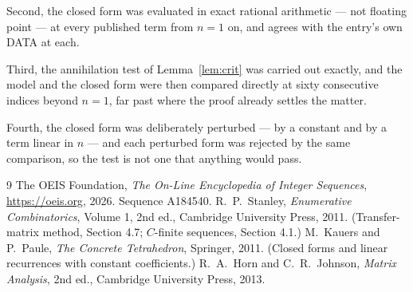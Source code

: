 \documentclass[11pt,a4paper]{article}
\theoremstyle{plain}
\theoremstyle{definition}
\begin{document}
Second, the closed form was evaluated in exact rational arithmetic --- not floating point ---
at every published term from $n=1$ on, and agrees with the entry's own DATA at each.

Third, the annihilation test of Lemma~\ref{lem:crit} was carried out exactly, and the model
and the closed form were then compared directly at sixty consecutive indices beyond
$n=1$, far past where the proof already settles the matter.

Fourth, the closed form was deliberately perturbed --- by a constant and by a term linear in
$n$ --- and each perturbed form was rejected by the same comparison, so the test is not one
that anything would pass.

\begin{thebibliography}{9}
 The OEIS Foundation, \emph{The On-Line Encyclopedia of Integer
Sequences}, \url{https://oeis.org}, 2026. Sequence A184540.
 R.~P.~Stanley, \emph{Enumerative Combinatorics}, Volume 1, 2nd ed.,
Cambridge University Press, 2011. (Transfer-matrix method, Section 4.7; $C$-finite sequences,
Section 4.1.)
 M.~Kauers and P.~Paule, \emph{The Concrete Tetrahedron}, Springer, 2011.
(Closed forms and linear recurrences with constant coefficients.)
 R.~A.~Horn and C.~R.~Johnson, \emph{Matrix Analysis}, 2nd ed., Cambridge
University Press, 2013.
\end{thebibliography}
\end{document}
